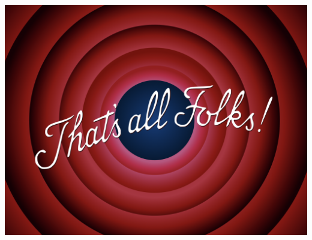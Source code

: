 \documentclass[xcolor=table,handout]{beamer}
\begin{document}
\begin{frame}
\includegraphics[scale = 0.4]{./img/end.png}
\end{frame}
\end{document}
